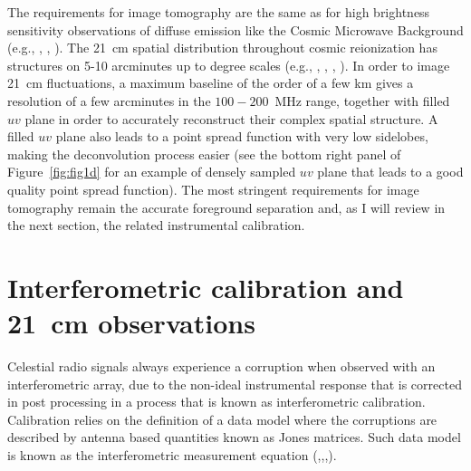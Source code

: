 The requirements for image tomography are the same as for high brightness sensitivity observations of diffuse emission like the Cosmic Microwave Background (e.g., \cite{halverson02}, \cite{dickinson04}, \cite{readhead04}). The 21~cm spatial distribution throughout cosmic reionization has structures on 5-10 arcminutes up to degree scales (e.g., \cite{majumdar12}, \cite{datta12}, \cite{mellema13}, \cite{kakiichi17}). In order to image 21~cm fluctuations, a maximum baseline of the order of a few km gives a resolution of a few arcminutes in the $100-200$~MHz range, together with filled $uv$ plane in order to accurately reconstruct their complex spatial structure. A filled $uv$ plane also leads to a point spread function with very low sidelobes, making the deconvolution process easier (see the bottom right panel of Figure~\ref{fig:fig1d} for an example of densely sampled $uv$ plane that leads to a good quality point spread function). The most stringent requirements for image tomography remain the accurate foreground separation and, as I will review in the next section, the related instrumental calibration.



\section{Interferometric calibration and 21~cm observations}
\label{sec:challenges}

Celestial radio signals always experience a corruption when observed with an interferometric array, due to the non-ideal instrumental response that is corrected in post processing in a process that is known as interferometric calibration. Calibration relies on the definition of a data model where the corruptions are described by antenna based quantities known as Jones matrices. Such data model is known as the interferometric measurement equation (\cite{hamaker96},\cite{smirnov11},\cite{smirnov11b},\cite{smirnov11c}).

